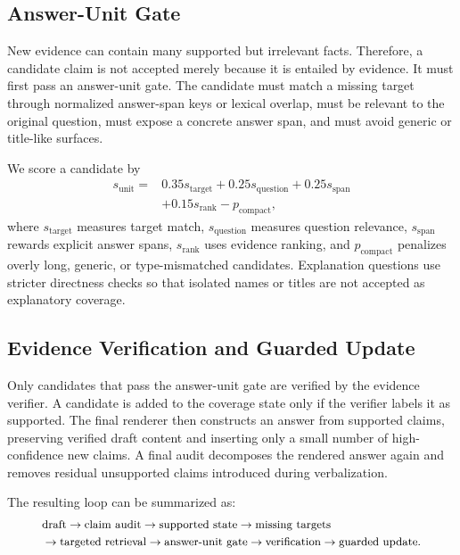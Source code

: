 \subsection{Answer-Unit Gate}

New evidence can contain many supported but irrelevant facts. Therefore, a candidate claim is not accepted merely because it is entailed by evidence. It must first pass an answer-unit gate. The candidate must match a missing target through normalized answer-span keys or lexical overlap, must be relevant to the original question, must expose a concrete answer span, and must avoid generic or title-like surfaces.

We score a candidate by
\begin{equation}
\begin{split}
    s_{\mathrm{unit}} =
    &0.35s_{\mathrm{target}}
    +0.25s_{\mathrm{question}}
    +0.25s_{\mathrm{span}} \\
    &+0.15s_{\mathrm{rank}}
    -p_{\mathrm{compact}},
\end{split}
\end{equation}
where $s_{\mathrm{target}}$ measures target match, $s_{\mathrm{question}}$ measures question relevance, $s_{\mathrm{span}}$ rewards explicit answer spans, $s_{\mathrm{rank}}$ uses evidence ranking, and $p_{\mathrm{compact}}$ penalizes overly long, generic, or type-mismatched candidates. Explanation questions use stricter directness checks so that isolated names or titles are not accepted as explanatory coverage.

\subsection{Evidence Verification and Guarded Update}

Only candidates that pass the answer-unit gate are verified by the evidence verifier. A candidate is added to the coverage state only if the verifier labels it as supported. The final renderer then constructs an answer from supported claims, preserving verified draft content and inserting only a small number of high-confidence new claims. A final audit decomposes the rendered answer again and removes residual unsupported claims introduced during verbalization.

The resulting loop can be summarized as:
\begin{equation}
\small
\begin{split}
&\mathrm{draft}
\rightarrow \mathrm{claim\ audit}
\rightarrow \mathrm{supported\ state}
\rightarrow \mathrm{missing\ targets}\\
&\rightarrow \mathrm{targeted\ retrieval}
\rightarrow \mathrm{answer\mbox{-}unit\ gate}
\rightarrow \mathrm{verification}
\rightarrow \mathrm{guarded\ update}.
\end{split}
\end{equation}

